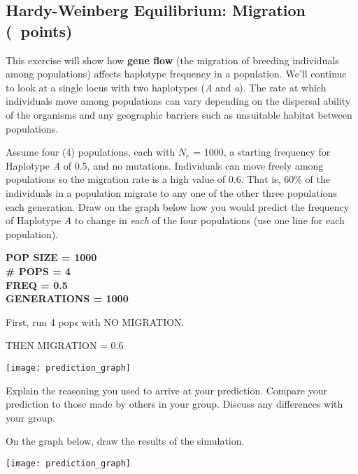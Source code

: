 \documentclass[11pt, addpoints]{exam}
\begin{document}
\subsection*{Hardy-Weinberg Equilibrium: Migration (\numpoints\ points)}

This exercise will show how \textbf{gene flow} (the migration of
breeding individuals among populations) affects haplotype frequency
in a population. We'll continue to look at a single locus with two
haplotypes (\emph{A} and \emph{a}). The rate at which individuals move 
among populations can vary depending on the dispersal ability of the 
organisms and any geographic barriers such as unsuitable habitat 
between populations.

\begin{questions}

\question
Assume four (4) populations, each with
$N_e$ = 1000, a starting frequency for Haplotype
\emph{A} of 0.5, and no mutations. Individuals can move freely among
populations so the migration rate is a high value of 0.6. That is, 60\%
of the individuals in a population migrate to any one of the other three
populations each generation. Draw on the graph below how you would
predict the frequency of Haplotype \emph{A} to change in \emph{each} of
the four populations (use one line for each population).

\ifprintanswers
	{\bfseries %
	POP SIZE = 1000\\
	\# POPS = 4\\
	FREQ = 0.5\\
	GENERATIONS = 1000
	
	First, run 4 pops with NO MIGRATION. 
	
	THEN MIGRATION = 0.6 }\vspace*{14\baselineskip}
\else
		\begin{center}
			\texttt{[image: prediction\_graph]}
		\end{center}
\fi

\question[1]
Explain the reasoning you used to arrive at your
prediction. Compare your prediction to those made by others in your
group. Discuss any differences with your group.

\newpage

\question On the graph below, draw the results of the simulation.

\begin{center}
	\texttt{[image: prediction\_graph]}
\end{center}


\end{questions}
\end{document}
